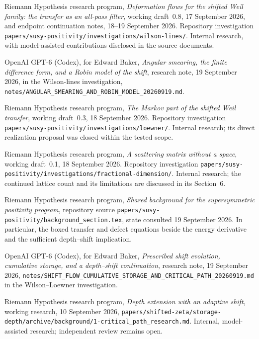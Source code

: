 Riemann Hypothesis research program, \emph{Deformation flows for the
shifted Weil family: the transfer as an all-pass filter}, working
draft~0.8, 17 September 2026, and endpoint continuation notes,
18--19 September 2026. Repository investigation
\nolinkurl{papers/susy-positivity/investigations/wilson-lines/}.
Internal research, with model-assisted contributions disclosed in
the source documents.

OpenAI GPT-6 (Codex), for Edward Baker,
\emph{Angular smearing, the finite difference form, and a Robin model
of the shift}, research note, 19 September 2026, in the Wilson-lines
investigation, \nolinkurl{notes/ANGULAR_SMEARING_AND_ROBIN_MODEL_20260919.md}.

Riemann Hypothesis research program,
\emph{The Markov part of the shifted Weil transfer}, working
draft~0.3, 18 September 2026. Repository investigation
\nolinkurl{papers/susy-positivity/investigations/loewner/}.
Internal research; its direct realization proposal was closed within
the tested scope.

Riemann Hypothesis research program,
\emph{A scattering matrix without a space}, working draft~0.1,
18 September 2026. Repository investigation
\nolinkurl{papers/susy-positivity/investigations/fractional-dimension/}.
Internal research; the continued lattice count and its limitations
are discussed in its Section~6.


Riemann Hypothesis research program,
\emph{Shared background for the supersymmetric positivity program},
repository source
\nolinkurl{papers/susy-positivity/background_section.tex},
state consulted 19 September 2026. In particular, the boxed
transfer and defect equations beside the energy derivative
and the sufficient depth--shift implication.

OpenAI GPT-6 (Codex), for Edward Baker,
\emph{Prescribed shift evolution, cumulative storage, and a
depth--shift continuation}, research note, 19 September 2026,
\nolinkurl{notes/SHIFT_FLOW_CUMULATIVE_STORAGE_AND_CRITICAL_PATH_20260919.md}
in the Wilson--Loewner investigation.

Riemann Hypothesis research program,
\emph{Depth extension with an adaptive shift}, working research,
10 September 2026,
\nolinkurl{papers/shifted-zeta/storage-depth/archive/background/1-critical_path_research.md}.
Internal, model-assisted research; independent review remains open.

